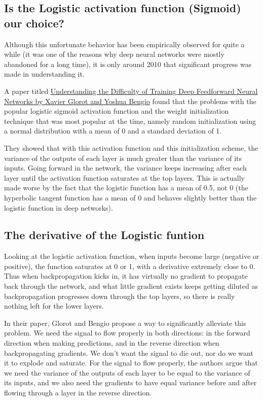\documentclass[%
oneside,                 %
final,                   %
10pt]{article}
\begin{document}
\subsection{Is the Logistic activation function (Sigmoid)  our choice?}

Although this unfortunate behavior has been empirically observed for
quite a while (it was one of the reasons why deep neural networks were
mostly abandoned for a long time), it is only around 2010 that
significant progress was made in understanding it.

A paper titled \href{{http://proceedings.mlr.press/v9/glorot10a.html}}{Understanding the Difficulty of Training Deep
Feedforward Neural Networks by Xavier Glorot and Yoshua Bengio} found that
the problems with the popular logistic
sigmoid activation function and the weight initialization technique
that was most popular at the time, namely random initialization using
a normal distribution with a mean of 0 and a standard deviation of
1. 

They showed that with this activation function and this
initialization scheme, the variance of the outputs of each layer is
much greater than the variance of its inputs. Going forward in the
network, the variance keeps increasing after each layer until the
activation function saturates at the top layers. This is actually made
worse by the fact that the logistic function has a mean of 0.5, not 0
(the hyperbolic tangent function has a mean of 0 and behaves slightly
better than the logistic function in deep networks).

\subsection{The derivative of the Logistic funtion}

Looking at the logistic activation function, when inputs become large
(negative or positive), the function saturates at 0 or 1, with a
derivative extremely close to 0. Thus when backpropagation kicks in,
it has virtually no gradient to propagate back through the network,
and what little gradient exists keeps getting diluted as
backpropagation progresses down through the top layers, so there is
really nothing left for the lower layers.

In their paper, Glorot and Bengio propose a way to significantly
alleviate this problem. We need the signal to flow properly in both
directions: in the forward direction when making predictions, and in
the reverse direction when backpropagating gradients. We don’t want
the signal to die out, nor do we want it to explode and saturate. For
the signal to flow properly, the authors argue that we need the
variance of the outputs of each layer to be equal to the variance of
its inputs, and we also need the gradients to have equal variance
before and after flowing through a layer in the reverse direction.
\end{document}

